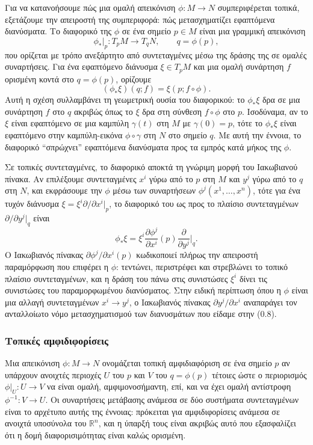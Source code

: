 \documentclass[12pt]{article}
\begin{document}
Για να κατανοήσουμε πώς μια ομαλή απεικόνιση $\phi: M \to N$ συμπεριφέρεται τοπικά, εξετάζουμε την απειροστή της συμπεριφορά: πώς μετασχηματίζει εφαπτόμενα διανύσματα. Το διαφορικό της $\phi$ σε ένα σημείο $p \in M$ είναι μια γραμμική απεικόνιση
\[
\phi_*|_p: T_pM \to T_{q}N, \qquad q = \phi(p),
\]
που ορίζεται με τρόπο ανεξάρτητο από συντεταγμένες μέσω της δράσης της σε ομαλές συναρτήσεις. Για ένα εφαπτόμενο διάνυσμα $\xi \in T_pM$ και μια ομαλή συνάρτηση $f$ ορισμένη κοντά στο $q = \phi(p)$, ορίζουμε
\[
(\phi_* \xi)(q; f) = \xi(p; f \circ \phi).
\]
Αυτή η σχέση συλλαμβάνει τη γεωμετρική ουσία του διαφορικού: το $\phi_* \xi$ δρα σε μια συνάρτηση $f$ στο $q$ ακριβώς όπως το $\xi$ δρα στη σύνθεση $f \circ \phi$ στο $p$. Ισοδύναμα, αν το $\xi$ είναι εφαπτόμενο σε μια καμπύλη $\gamma(t)$ στη $M$ με $\gamma(0) = p$, τότε το $\phi_* \xi$ είναι εφαπτόμενο στην καμπύλη-εικόνα $\phi \circ \gamma$ στη $N$ στο σημείο $q$. Με αυτή την έννοια, το διαφορικό ``σπρώχνει'' εφαπτόμενα διανύσματα προς τα εμπρός κατά μήκος της $\phi$.

Σε τοπικές συντεταγμένες, το διαφορικό αποκτά τη γνώριμη μορφή του Ιακωβιανού πίνακα. Αν επιλέξουμε συντεταγμένες $x^i$ γύρω από το $p$ στη $M$ και $y^j$ γύρω από το $q$ στη $N$, και εκφράσουμε την $\phi$ μέσω των συναρτήσεων $\phi^j(x^1, \dots, x^n)$, τότε για ένα τυχόν διάνυσμα $\xi = \xi^i \partial / \partial x^i|_p$, το διαφορικό του ως προς το πλαίσιο συντεταγμένων $\partial / \partial y^j|_q$ είναι
\[
\phi_* \xi = \xi^i \frac{\partial \phi^j}{\partial x^i}(p) \frac{\partial}{\partial y^j}\bigg|_{q}. \tag{0.11}
\]
Ο Ιακωβιανός πίνακας $\partial \phi^j / \partial x^i(p)$ κωδικοποιεί πλήρως την απειροστή παραμόρφωση που επιφέρει η $\phi$: τεντώνει, περιστρέφει και στρεβλώνει το τοπικό πλαίσιο συντεταγμένων, και η δράση του πάνω στις συνιστώσες $\xi^i$ δίνει τις συνιστώσες του παραμορφωμένου διανύσματος. Στην ειδική περίπτωση όπου η $\phi$ είναι μια αλλαγή συντεταγμένων $x^i \to y^j$, ο Ιακωβιανός πίνακας $\partial y^j / \partial x^i$ αναπαράγει τον ανταλλοίωτο νόμο μετασχηματισμού των διανυσμάτων που είδαμε στην (0.8).

\subsubsection{Τοπικές αμφιδιφορίσεις}

Μια απεικόνιση $\phi: M \to N$ ονομάζεται τοπική αμφιδιαφόριση σε ένα σημείο $p$ αν υπάρχουν ανοιχτές περιοχές $U$ του $p$ και $V$ του $q = \phi(p)$ τέτοιες ώστε ο περιορισμός $\phi|_U: U \to V$ να είναι ομαλή, αμφιμονοσήμαντη, επί, και να έχει ομαλή αντίστροφη $\phi^{-1}: V \to U$. Οι συναρτήσεις μετάβασης ανάμεσα σε δύο συστήματα συντεταγμένων είναι το αρχέτυπο αυτής της έννοιας: πρόκειται για αμφιδιφορίσεις ανάμεσα σε ανοιχτά υποσύνολα του $\mathbb{R}^n$, και η ύπαρξή τους είναι ακριβώς αυτό που εξασφαλίζει ότι η δομή διαφορισιμότητας είναι καλώς ορισμένη.
\end{document}
